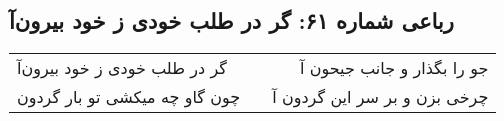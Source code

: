\begin{center}
\section*{رباعی شماره ۶۱: گر در طلب خودی ز خود بیرون‌آ}
\label{sec:0061}
\begin{longtable}{l p{0.5cm} r}
گر در طلب خودی ز خود بیرون‌آ
&&
جو را بگذار و جانب جیحون آ
\\
چون گاو چه میکشی تو بار گردون
&&
چرخی بزن و بر سر این گردون آ
\\
\end{longtable}
\end{center}
